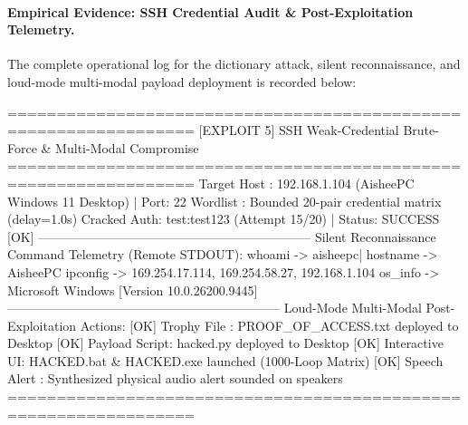 \vspace{3pt}
\paragraph{Empirical Evidence: SSH Credential Audit \& Post-Exploitation Telemetry.}
The complete operational log for the dictionary attack, silent reconnaissance, and loud-mode
multi-modal payload deployment is recorded below:

\begin{logbox}
=================================================================
  [EXPLOIT 5] SSH Weak-Credential Brute-Force & Multi-Modal Compromise
=================================================================
  Target Host : 192.168.1.104 (AisheePC Windows 11 Desktop) | Port: 22
  Wordlist    : Bounded 20-pair credential matrix (delay=1.0s)
  Cracked Auth: test:test123 (Attempt 15/20) | Status: SUCCESS [OK]
-----------------------------------------------------------------
  Silent Reconnaissance Command Telemetry (Remote STDOUT):
    whoami   -> aisheepc\test  |  hostname -> AisheePC
    ipconfig -> 169.254.17.114, 169.254.58.27, 192.168.1.104
    os_info  -> Microsoft Windows [Version 10.0.26200.9445]
-----------------------------------------------------------------
  Loud-Mode Multi-Modal Post-Exploitation Actions:
    [OK] Trophy File   : PROOF_OF_ACCESS.txt deployed to Desktop
    [OK] Payload Script: hacked.py deployed to Desktop
    [OK] Interactive UI: HACKED.bat & HACKED.exe launched (1000-Loop Matrix)
    [OK] Speech Alert  : Synthesized physical audio alert sounded on speakers
=================================================================
\end{logbox}

